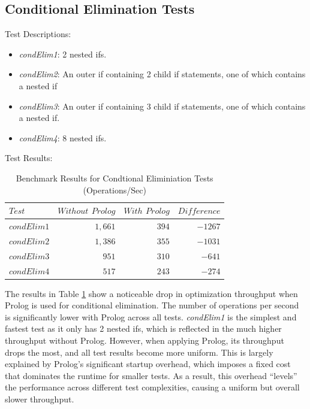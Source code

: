 \subsection*{Conditional Elimination Tests}

Test Descriptions:
\begin{itemize}
    \item \textit{condElim1}: 2 nested ifs.
    \item \textit{condElim2}: An outer if containing 2 child if statements, one of which contains a nested if
    \item \textit{condElim3}: An outer if containing 3 child if statements, one of which contains a nested if.
    \item \textit{condElim4}: 8 nested ifs.
\end{itemize}

Test Results:
\begin{table}[h]
    \centering
    \begin{tabular}{|l|r|r|r|}
        \hline
        $Test$ & $Without$ $Prolog$ & $With$ $Prolog$ & $Difference$ \\
        \hline
        $condElim1$ & $1,661$ & $394$ & $-1267$ \\
        $condElim2$ & $1,386$ & $355$ & $-1031$ \\
        $condElim3$ & $951$ & $310$ & $-641$ \\
        $condElim4$ & $517$ & $243$ & $-274$ \\
        \hline
    \end{tabular}
    \caption{Benchmark Results for Condtional Eliminiation Tests (Operations/Sec)}
    \label{table:condElimination}
\end{table} 
\smallbreak

\vspace{-10pt}
The results in Table \ref{table:condElimination} show a noticeable drop in optimization throughput when Prolog is used for conditional elimination. The number of operations per second is significantly lower with Prolog across all tests. \textit{condElim1} is the simplest and fastest test as it only has 2 nested ifs, which is reflected in the much higher throughput without Prolog. However, when applying Prolog, its throughput drops the most, and all test results become more uniform. This is largely explained by Prolog’s significant startup overhead, which imposes a fixed cost that dominates the runtime for smaller tests. As a result, this overhead “levels” the performance across different test complexities, causing a uniform but overall slower throughput.
